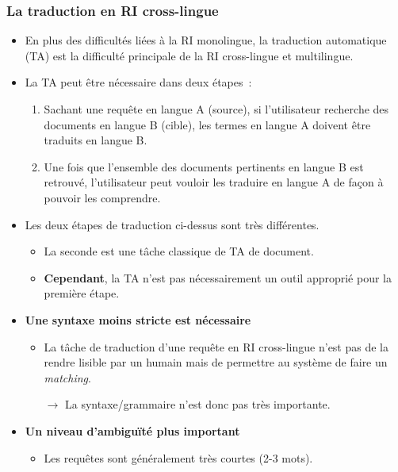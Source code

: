 \documentclass[11pt,aspectratio=43,dvipsnames,table]{beamer}
\begin{document}
\begin{frame}[allowframebreaks]
    \frametitle{La traduction en RI cross-lingue}
    \begin{itemize} \itemsep10pt
        \item En plus des difficultés liées à la RI monolingue, la traduction 
              automatique (TA) est la difficulté principale de la RI 
              cross-lingue et multilingue.
        \item La TA peut être nécessaire dans deux étapes~:
        \begin{enumerate}
            \item Sachant une requête en langue A (source), si l'utilisateur 
                  recherche des documents en langue B (cible), les termes en 
                  langue A doivent être traduits en langue B.
            \item Une fois que l'ensemble des documents pertinents en langue B 
                  est retrouvé, l'utilisateur peut vouloir les traduire en 
                  langue A de façon à pouvoir les comprendre.
        \end{enumerate}

        \framebreak

        \item Les deux étapes de traduction ci-dessus sont très différentes.
        \begin{itemize}
            \item La seconde est une tâche classique de TA de document.
            \item \textbf{Cependant}, la TA n'est pas nécessairement un outil 
                  approprié pour la première étape.
        \end{itemize}
        \item \textbf{Une syntaxe moins stricte est nécessaire}
        \begin{itemize}
            \item La tâche de traduction d'une requête en RI cross-lingue 
                  n'est pas de la rendre lisible par un humain mais de permettre
                  au système de faire un \textit{matching}.
            \item[$\to$] La syntaxe/grammaire n'est donc pas très importante.
        \end{itemize}
        \item \textbf{Un niveau d'ambiguïté plus important}
        \begin{itemize}
            \item Les requêtes sont généralement très courtes (2-3 mots).
        \end{itemize}


\end{itemize}
\end{frame}
\end{document}

